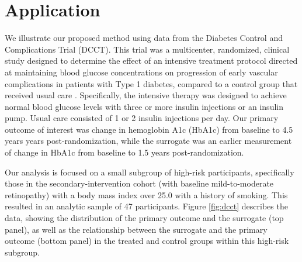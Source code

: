 \documentclass[12pt]{article}
\begin{document}
\section{Application}\label{sec:application}
We illustrate our proposed method using  data from the Diabetes Control and Complications Trial (DCCT). This trial was a multicenter, randomized, clinical study designed to determine the effect of an intensive treatment protocol directed at maintaining blood glucose concentrations on progression of early vascular complications in patients with Type 1 diabetes, compared to a control group that received usual care \citep{dcct1987diabetes,Lachin2021DCCT,diabetes1993effect}.  Specifically, the intensive therapy was designed to achieve normal blood glucose levels with three or more insulin injections or an insulin pump. Usual care consisted of 1 or 2 insulin injections per day. Our primary outcome of interest was change in hemoglobin A1c (HbA1c) from baseline to 4.5 years years post-randomization, while the surrogate was an earlier measurement of change in HbA1c from baseline to 1.5 years post-randomization.

Our analysis is focused on a small subgroup of high-risk participants, specifically those in the secondary-intervention cohort (with baseline mild-to-moderate retinopathy) with a body mass index over 25.0 with a history of smoking. This resulted in an analytic sample of 47 participants. Figure \ref{fig:dcct} describes the data, showing the distribution of the primary outcome and the surrogate (top panel), as well as the relationship between the surrogate and the primary outcome (bottom panel) in the treated and control groups within this high-risk subgroup.
\end{document}
